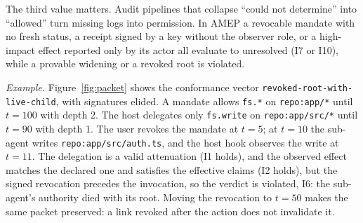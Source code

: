 \documentclass[conference]{IEEEtran}
\newcommand{\pres}{\textsf{preserved}}
\newcommand{\viol}{\textsf{violated}}
\newcommand{\unres}{\textsf{unresolved}}
\newcommand{\code}[1]{\texttt{\small #1}}
\begin{document}
The third value matters. Audit pipelines that collapse ``could not determine'' into ``allowed'' turn missing logs into permission. In AMEP a revocable mandate with no fresh status, a receipt signed by a key without the observer role, or a high-impact effect reported only by its actor all evaluate to \unres{} (I7 or I10), while a provable widening or a revoked root is \viol{}.

\emph{Example.} Figure~\ref{fig:packet} shows the conformance vector \code{revoked-root-with-live-child}, with signatures elided. A mandate allows \code{fs.*} on \code{repo:app/*} until $t{=}100$ with depth 2. The host delegates only \code{fs.write} on \code{repo:app/src/*} until $t{=}90$ with depth 1. The user revokes the mandate at $t{=}5$; at $t{=}10$ the sub-agent writes \code{repo:app/src/auth.ts}, and the host hook observes the write at $t{=}11$. The delegation is a valid attenuation (I1 holds), and the observed effect matches the declared one and satisfies the effective claims (I2 holds), but the signed revocation precedes the invocation, so the verdict is \viol{}, I6: the sub-agent's authority died with its root. Moving the revocation to $t{=}50$ makes the same packet \pres{}: a link revoked after the action does not invalidate it.
\end{document}
